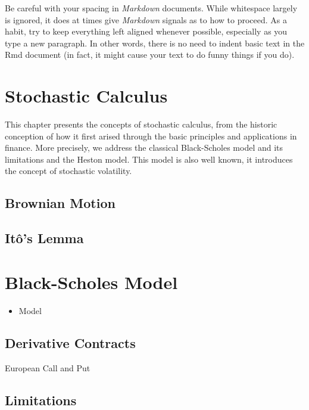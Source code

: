 \documentclass[12pt,twoside]{reedthesis}
\providecommand{\tightlist}{%
  \setlength{\itemsep}{0pt}\setlength{\parskip}{0pt}}
\theoremstyle{definition}
\theoremstyle{definition}
\theoremstyle{remark}
\begin{document}
  Be careful with your spacing in \emph{Markdown} documents. While
  whitespace largely is ignored, it does at times give \emph{Markdown}
  signals as to how to proceed. As a habit, try to keep everything left
  aligned whenever possible, especially as you type a new paragraph. In
  other words, there is no need to indent basic text in the Rmd document
  (in fact, it might cause your text to do funny things if you do).
  
  \section{Stochastic Calculus}\label{stochastic-calculus}
  
  This chapter presents the concepts of stochastic calculus, from the
  historic conception of how it first arised through the basic principles
  and applications in finance. More precisely, we address the classical
  Black-Scholes model and its limitations and the Heston model. This model
  is also well known, it introduces the concept of stochastic volatility.
  
  \subsection{Brownian Motion}\label{brownian-motion}
  
  \subsection{Itô's Lemma}\label{itos-lemma}
  
  \section{Black-Scholes Model}\label{black-scholes-model}
  
  \begin{itemize}
  \tightlist
  \item
    Model
  \end{itemize}
  
  \subsection{Derivative Contracts}\label{derivative-contracts}
  
  European Call and Put
  
  \subsection{Limitations}\label{limitations}
  
\end{document}
